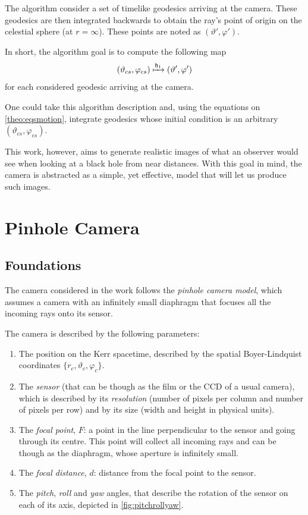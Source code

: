 The algorithm consider a set of timelike geodesics arriving at the camera. These geodesics are then integrated backwards to obtain the ray's point of origin on the celestial sphere (at $r = \infty$). These points are noted as $(\vartheta', \varphi')$.

In short, the algorithm goal is to compute the following map
\begin{equation}
	\label{eq:initmap}
	(\vartheta_{cs}, \varphi_{cs}) \xmapsto{\mathfrak{h}_1} (\vartheta', \varphi')
\end{equation}
for each considered geodesic arriving at the camera.

One could take this algorithm description and, using the equations on \autoref{theo:eqsmotion}, integrate geodesics whose initial condition is an arbitrary $(\vartheta_{cs}, \varphi_{cs})$.

This work, however, aims to generate realistic images of what an observer would see when looking at a black hole from near distances. With this goal in mind, the camera is abstracted as a simple, yet effective, model that will let us produce such images.

\section{Pinhole Camera}

\subsection{Foundations}

The camera considered in the work follows the \emph{pinhole camera model}, which assumes a camera with an infinitely small diaphragm that focuses all the incoming rays onto its sensor.

The camera is described by the following parameters:
\begin{enumerate}
	\item The position on the Kerr spacetime, described by the spatial Boyer-Lindquist coordinates $\{r_c, \vartheta_c, \varphi_c\}$.
	\item The \emph{sensor} (that can be though as the film or the CCD of a usual camera), which is described by its \emph{resolution} (number of pixels per column and number of pixels per row) and by its size (width and height in physical units).
	\item The \emph{focal point}, $F$: a point in the line perpendicular to the sensor and going through its centre. This point will collect all incoming rays and can be though as the diaphragm, whose aperture is infinitely small.
	\item The \emph{focal distance}, $d$: distance from the focal point to the sensor.
	\item The \emph{pitch}, \emph{roll} and \emph{yaw} angles, that describe the rotation of the sensor on each of its axis, depicted in \autoref{fig:pitchrollyaw}.
\end{enumerate}

